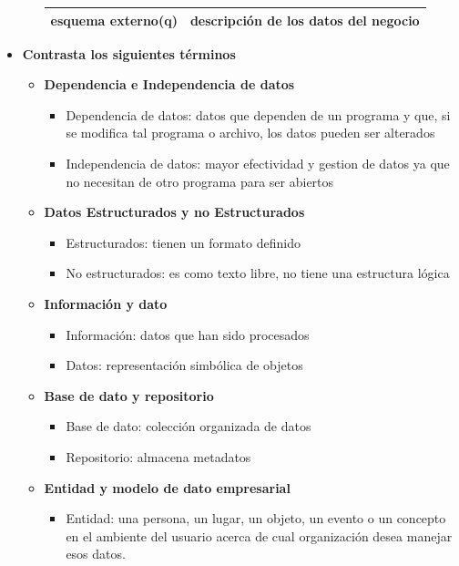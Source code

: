 \documentclass[letterpaper,12pt]{article}
\begin{document}
\begin{sloppypar}
\begin{itemize}
\begin{enumerate}
\begin{center}
\begin{tabular}[H]{|c|c|}
            esquema externo(q) & descripción de los datos del negocio\\ \hline 
            \end{tabular}
        \end{center}
    \end{enumerate}
    \item \textbf{Contrasta los siguientes términos}
    \begin{itemize}
        \item \textbf{Dependencia e Independencia de datos}
        \begin{itemize}
            \item Dependencia de datos: datos que dependen de un programa y que, si se modifica tal programa o archivo, los datos pueden ser alterados
            \item Independencia de datos: mayor efectividad y gestion de datos ya que no necesitan de otro programa para ser abiertos
        \end{itemize}
        \item \textbf{Datos Estructurados y no Estructurados}
        \begin{itemize}
            \item Estructurados: tienen un formato definido 
            \item No estructurados: es como texto libre, no tiene una estructura lógica
        \end{itemize}
        \newpage
        \item \textbf{Información y dato}
        \begin{itemize}
            \item Información: datos que han sido procesados
            \item Datos: representación simbólica de objetos
        \end{itemize}
        \item \textbf{Base de dato y repositorio}
        \begin{itemize}
            \item Base de dato: colección organizada de datos 
            \item Repositorio: almacena metadatos
        \end{itemize}
        \item \textbf{Entidad y modelo de dato empresarial}
        \begin{itemize}
            \item Entidad: una persona, un lugar, un objeto, un evento o un concepto en el ambiente del usuario acerca de cual organización desea manejar esos datos.

\end{itemize}
\end{itemize}
\end{itemize}
\end{sloppypar}
\end{document}

